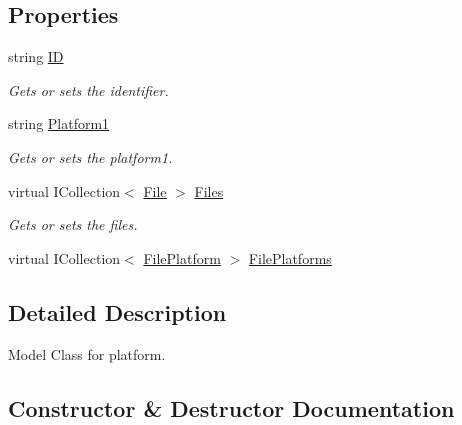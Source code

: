 \subsection*{Properties}
\begin{DoxyCompactItemize}
\item 
string \hyperlink{class_open_1_1_g_i_1_1hypermart_1_1_models_1_1_platform_ae11ad27de467131d539e35f598ff3051}{ID}
\begin{DoxyCompactList}\small\item\em Gets or sets the identifier. \end{DoxyCompactList}\item 
string \hyperlink{class_open_1_1_g_i_1_1hypermart_1_1_models_1_1_platform_aa93619cbb18655b2425f416df0f194c6}{Platform1}
\begin{DoxyCompactList}\small\item\em Gets or sets the platform1. \end{DoxyCompactList}\item 
virtual I\+Collection$<$ \hyperlink{class_open_1_1_g_i_1_1hypermart_1_1_models_1_1_file}{File} $>$ \hyperlink{class_open_1_1_g_i_1_1hypermart_1_1_models_1_1_platform_a984a31b30ada1f33acef9099c09d9ca0}{Files}
\begin{DoxyCompactList}\small\item\em Gets or sets the files. \end{DoxyCompactList}\item 
virtual I\+Collection$<$ \hyperlink{class_open_1_1_g_i_1_1hypermart_1_1_models_1_1_file_platform}{File\+Platform} $>$ \hyperlink{class_open_1_1_g_i_1_1hypermart_1_1_models_1_1_platform_ac358f8b1b556f6d99fb47fdb29de7202}{File\+Platforms}
\end{DoxyCompactItemize}


\subsection{Detailed Description}
Model Class for platform. 



\subsection{Constructor \& Destructor Documentation}
\hypertarget{class_open_1_1_g_i_1_1hypermart_1_1_models_1_1_platform_a6c806705f4dc1171773096a5249a1563}{}\label{class_open_1_1_g_i_1_1hypermart_1_1_models_1_1_platform_a6c806705f4dc1171773096a5249a1563} 
